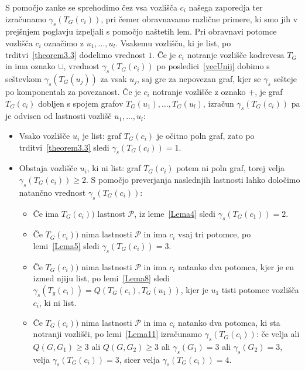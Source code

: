 \documentclass[12pt,a4paper,twoside]{article}
\theoremstyle{definition} %
\theoremstyle{plain} %
\numberwithin{equation}{section}  %
\begin{document}
S pomočjo zanke se sprehodimo čez vsa vozlišča $c_i$ našega zaporedja ter izračunamo $\gamma_s(T_G(c_i))$, pri čemer obravnavamo različne primere, ki smo jih v prejšnjem poglavju izpeljali s pomočjo naštetih lem. Pri obravnavi potomce vozlišča $c_i$ označimo z $u_1, ..., u_l$. Vsakemu vozlišču, ki je list, po trditvi~\ref{theorem3.3} dodelimo vrednost $1$. Če je  $c_i$ notranje vozlišče kodrevesa $T_G$ in ima oznako $\cup$, vrednost $\gamma_s(T_G(c_i))$ po posledici~\ref{vecUnij} dobimo s seštevkom $\gamma_s(T_G(u_j))$ za vsak $u_j$, saj gre za nepovezan graf, kjer se $\gamma_s$ sešteje po komponentah za povezanost. Če je $c_i$ notranje vozlišče z oznako $+$, je graf $T_G(c_i)$ dobljen s spojem grafov $T_G(u_1), \dots , T_G(u_l)$, izračun $\gamma_s(T_G(c_i))$ pa je odvisen od lastnosti vozlišč $u_1, \dots, u_l$:
\begin{itemize}
\item Vsako vozlišče $u_i$ je list: graf $T_G(c_i)$ je očitno poln graf, zato po trditvi~\ref{theorem3.3} sledi $\gamma_s(T_G(c_i)) = 1$. 
\item Obstaja vozlišče $u_i$, ki ni list: graf $T_G(c_i)$ potem ni poln graf, torej velja $\gamma_s(T_G(c_i)) \geq 2$. S pomočjo preverjanja naslednjih lastnosti lahko določimo natančno vrednost $\gamma_s(T_G(c_i))$:
\begin{itemize}
\item Če ima $T_G(c_i))$ lastnost $\mathcal{P}$, iz leme~\ref{Lema4} sledi $\gamma_s(T_G(c_1)) = 2$.
\item Če $T_G(c_i))$ nima lastnosti $\mathcal{P}$ in ima $c_i$ vsaj tri potomce, po lemi~\ref{Lema5} sledi $\gamma_s(T_G(c_i)) = 3$.
\item Če $T_G(c_i))$ nima lastnosti $\mathcal{P}$ in ima $c_i$ natanko dva potomca, kjer je en izmed njiju list, po lemi~\ref{Lema8} sledi $\gamma_s(T_g(c_i)) = Q(T_G(c_i), T_G(u_1))$, kjer je $u_1$ tisti potomec vozlišča $c_i$, ki ni list.
\item Če $T_G(c_i))$ nima lastnosti $\mathcal{P}$ in ima $c_i$ natanko dva potomca, ki sta notranji vozlišči, po lemi~\ref{Lema11} izračunamo $\gamma_s(T_G(c_i))$: če velja ali $Q(G, G_1) \geq 3$ ali $Q(G, G_2) \geq 3$ ali $\gamma_s(G_1) = 3$ ali $\gamma_s(G_2) = 3$, velja $\gamma_s(T_G(c_i)) = 3$, sicer velja $\gamma_s(T_G(c_i)) = 4$.
\end{itemize}
\end{itemize}
\end{document}
